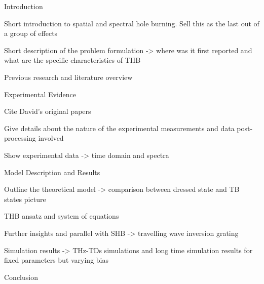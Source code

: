 \documentclass[journal]{IEEEtran}
\begin{document}
\begin{outline}
\item {Introduction}
\begin{outline}
	\item {Short introduction to spatial and spectral hole burning. Sell this as the last out of a group of effects} 
	\item {Short description of the problem formulation -> where was it first reported and what are the specific characteristics of THB} 
	\item {Previous research and literature overview}
\end{outline}
\item{ Experimental Evidence} 
\begin{outline}
	\item {Cite David's original papers}
	\item {Give details about the nature of the experimental measurements and data post-processing involved}
	\item {Show experimental data -> time domain and spectra}  
\end{outline}	
\item{Model Description and Results}
\begin{outline}
	\item { Outline the theoretical model -> comparison between dressed state and TB states picture}
	\item { THB ansatz and system of equations }
	\item { Further insights and parallel with SHB -> travelling wave inversion grating}
	\item { Simulation results -> THz-TDs simulations and long time simulation results for fixed parameters but varying bias} 	
\end{outline}
\item{Conclusion}	
\end{outline}
\end{document}
